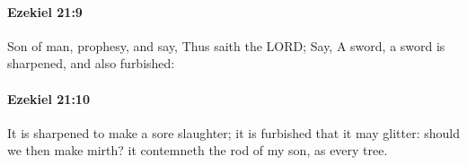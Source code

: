 		\paragraph{Ezekiel 21:9} %
			\label{EZEKIEL-21-9}

			Son of man, prophesy, and say, Thus saith the LORD; Say, A sword, a sword is sharpened, and also furbished:


		\paragraph{Ezekiel 21:10} %
			\label{EZEKIEL-21-10}

			It is sharpened to make a sore slaughter; it is furbished that it may glitter: should we then make mirth? it contemneth the rod of my son, as every tree.



